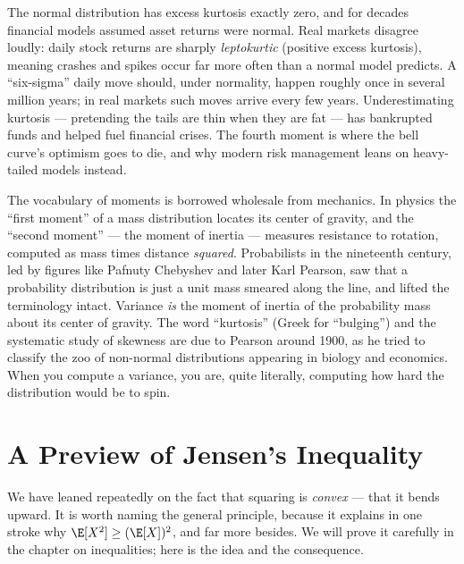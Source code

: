 \begin{applicationbox}
The normal distribution has excess kurtosis exactly zero, and for decades
financial models assumed asset returns were normal. Real markets disagree
loudly: daily stock returns are sharply \emph{leptokurtic} (positive excess
kurtosis), meaning crashes and spikes occur far more often than a normal model
predicts. A ``six-sigma'' daily move should, under normality, happen roughly
once in several million years; in real markets such moves arrive every few
years. Underestimating kurtosis --- pretending the tails are thin when they
are fat --- has bankrupted funds and helped fuel financial crises. The fourth
moment is where the bell curve's optimism goes to die, and why modern risk
management leans on heavy-tailed models instead.
\end{applicationbox}

\begin{historybox}
The vocabulary of moments is borrowed wholesale from mechanics. In physics the
``first moment'' of a mass distribution locates its center of gravity, and the
``second moment'' --- the moment of inertia --- measures resistance to
rotation, computed as mass times distance \emph{squared}. Probabilists in the
nineteenth century, led by figures like Pafnuty Chebyshev and later Karl
Pearson, saw that a probability distribution is just a unit mass smeared along
the line, and lifted the terminology intact. Variance \emph{is} the moment of
inertia of the probability mass about its center of gravity. The word
``kurtosis'' (Greek for ``bulging'') and the systematic study of skewness
are due to Pearson around 1900, as he tried to classify the zoo of
non-normal distributions appearing in biology and economics. When you compute
a variance, you are, quite literally, computing how hard the distribution
would be to spin.
\end{historybox}

\section{A Preview of Jensen's Inequality}
\label{ch09:jensen}

We have leaned repeatedly on the fact that squaring is \emph{convex} --- that
it bends upward. It is worth naming the general principle, because it explains
in one stroke why $\E[X^2] \ge (\E[X])^2$, and far more besides. We will prove
it carefully in the chapter on inequalities; here is the idea and the
consequence.

